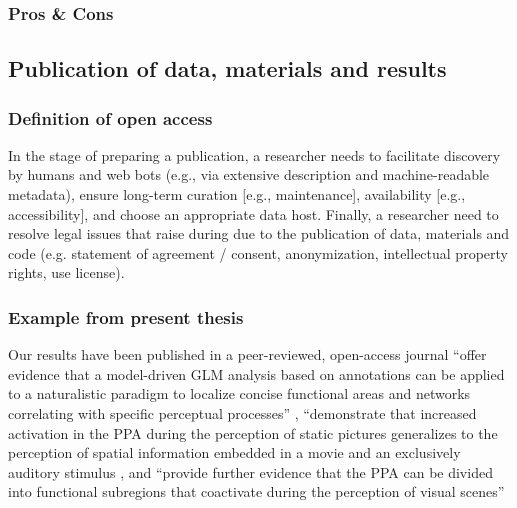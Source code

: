 \subsubsection{Pros \& Cons}


\subsection{Publication of data, materials and results}

\subsubsection{Definition of open access}

In the stage of preparing a publication, a researcher needs to facilitate
discovery by humans and web bots (e.g., via extensive description and
machine-readable metadata), ensure long-term curation [e.g., maintenance],
availability [e.g., accessibility], and choose an appropriate data host.
Finally, a researcher need to resolve legal issues that raise during due to the
publication of data, materials and code (e.g. statement of agreement / consent,
anonymization, intellectual property rights, use license).



\subsubsection{Example from present thesis}



Our results have been published in a peer-reviewed, open-access journal
%
``offer evidence that a model-driven GLM analysis based on annotations can be
applied to a naturalistic paradigm to localize concise functional areas and
networks correlating with specific perceptual processes''
\citep{haeusler2022processing},
%
``demonstrate that increased activation in the PPA during the perception of
static pictures generalizes to the perception of spatial information embedded in
a movie and an exclusively auditory stimulus \citep{haeusler2022processing}, and
%
``provide further evidence that the PPA can be divided into functional
subregions that coactivate during the perception of visual scenes''
\citep{haeusler2022processing}

